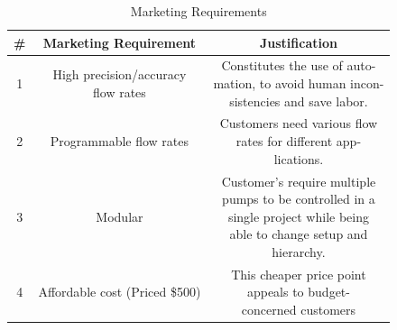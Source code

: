 \documentclass[journal]{IEEEtran}
\begin{document}
            \begin{table}[H]
                \renewcommand{\arraystretch}{1.3}
                \caption{Marketing Requirements}
                \label{table:MarketingReq}
                \begin{center}
                    \begin{tabular}{|c|c|c|}
                        \hline
                        \bfseries \# & \bfseries Marketing Requirement & \bfseries Justification \\
                        \hline
                        
                        1 & \makecell{High precision/accuracy \\ flow rates} &  \makecell[l]{Constitutes the use of auto-\\
                                     mation, to avoid human incon-\\
                                     sistencies and save labor.}\\
                        \hline
                        
                        2 & Programmable flow rates & 
                        \makecell[l]{Customers need various flow\\
                                     rates for different app-\\
                                     lications.} \\
                        \hline
                        
                        3 & Modular & 
                        \makecell[l]{Customer’s require multiple\\
                                     pumps to be controlled in a\\
                                     single project while being\\
                                     able to change setup and\\
                                     hierarchy.} \\
                        \hline
                        
                        4 & Affordable cost (Priced \$500)  & 
                        \makecell[l]{This cheaper price point\\
                                     appeals to budget-\\
                                     concerned customers} \\
                        \hline
                        

\end{tabular}
\end{center}
\end{table}
\end{document}
